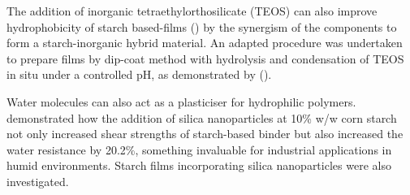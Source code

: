 \par The addition of inorganic tetraethylorthosilicate (TEOS) can also improve hydrophobicity of starch based-films (\cite{TEOS}) by the synergism of the components to form a starch-inorganic hybrid material. An adapted procedure was undertaken to prepare films by dip-coat method with hydrolysis and condensation of TEOS in situ under a controlled pH, as demonstrated by (\cite{TEOS}). 
\par Water molecules can also act as a plasticiser for hydrophilic polymers. \cite{wang_gu_hong_cheng_li_2011} demonstrated how the addition of silica nanoparticles at 10\% w/w corn starch not only increased shear strengths of starch-based binder but also increased the water resistance by 20.2\%, something invaluable for industrial applications in humid environments. Starch films incorporating silica nanoparticles were also investigated.

